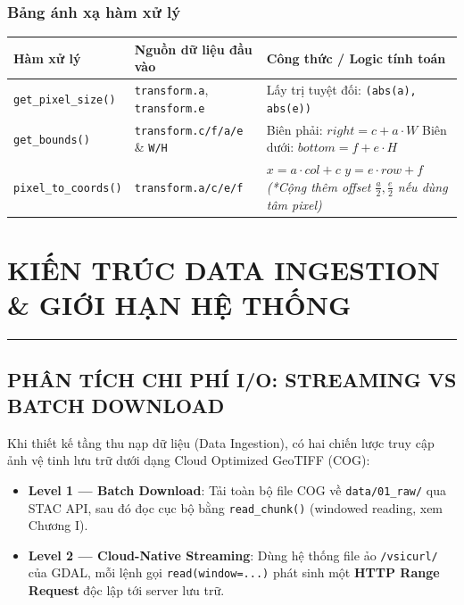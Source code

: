 \documentclass[12pt,a4paper]{report}
\begin{document}
\subsection*{Bảng ánh xạ hàm xử lý}

\begin{table}[H]
\centering
\begin{tabularx}{\textwidth}{|l|l|X|}
\hline
\rowcolor{blue!80!black}
{\color{white}\textbf{Hàm xử lý}} & {\color{white}\textbf{Nguồn dữ liệu đầu vào}} & {\color{white}\textbf{Công thức / Logic tính toán}} \\
\hline
\texttt{get\_pixel\_size()} & \texttt{transform.a}, \texttt{transform.e} & Lấy trị tuyệt đối: \texttt{(abs(a), abs(e))} \\
\hline
\texttt{get\_bounds()} & \texttt{transform.c/f/a/e} \& \texttt{W/H} & Biên phải: $right = c + a \cdot W$ \newline Biên dưới: $bottom = f + e \cdot H$ \\
\hline
\texttt{pixel\_to\_coords()} & \texttt{transform.a/c/e/f} & $x = a \cdot col + c$ \newline $y = e \cdot row + f$ \newline \textit{(*Cộng thêm offset $\frac{a}{2}, \frac{e}{2}$ nếu dùng tâm pixel)} \\
\hline
\end{tabularx}
\end{table}

\chapter{KIẾN TRÚC DATA INGESTION \& GIỚI HẠN HỆ THỐNG}
\noindent\rule{\textwidth}{0.4pt}

\section{PHÂN TÍCH CHI PHÍ I/O: STREAMING VS BATCH DOWNLOAD}

Khi thiết kế tầng thu nạp dữ liệu (Data Ingestion), có hai chiến lược truy cập ảnh vệ tinh lưu trữ dưới dạng Cloud Optimized GeoTIFF (COG):

\begin{itemize}
    \item \textbf{Level 1 — Batch Download}: Tải toàn bộ file COG về \texttt{data/01\_raw/} qua STAC API, sau đó đọc cục bộ bằng \texttt{read\_chunk()} (windowed reading, xem Chương I).
    \item \textbf{Level 2 — Cloud-Native Streaming}: Dùng hệ thống file ảo \texttt{/vsicurl/} của GDAL, mỗi lệnh gọi \texttt{read(window=...)} phát sinh một \textbf{HTTP Range Request} độc lập tới server lưu trữ.
\end{itemize}
\end{document}
